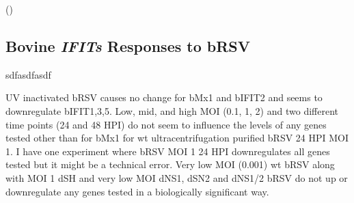 (\cite{McClurkin1974ComparisonVirus})


\subsection{Bovine \textit{IFITs} Responses to bRSV} \label{subsec:Bovine IFITs Responses to bRSV}

sdfasdfasdf


UV inactivated bRSV causes no change for bMx1 and bIFIT2 and seems to downregulate bIFIT1,3,5. Low, mid, and high MOI (0.1, 1, 2) and two different time points (24 and 48 HPI) do not seem to influence the levels of any genes tested other than for bMx1 for wt ultracentrifugation purified bRSV 24 HPI MOI 1. I have one experiment where bRSV MOI 1 24 HPI downregulates all genes tested but it might be a technical error. 
Very low MOI (0.001) wt bRSV along with MOI 1 dSH and very low MOI dNS1, dSN2 and dNS1/2 bRSV do not up or downregulate any genes tested in a biologically significant way.

